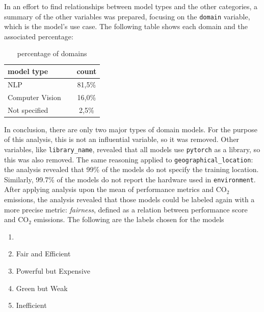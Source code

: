 \documentclass[journal]{IEEEtran}
\begin{document}
	 In an effort to find relationships between model types and the other categories, a summary of the other variables was prepared, focusing on the \texttt{domain} variable, which is the model's use case. The following table shows each domain and the associated percentage:
	 \begin{table}[H]
	 	\centering
	 	\caption{percentage of domains}
	 	\begin{tabular}{l c }
	 		\toprule
	 		model type & count \\
	 		\midrule
	 		NLP  & 81,5\% \\
	 		Computer Vision & 16,0\% \\
	 		Not specified        & 2,5\% \\
	 		\bottomrule
	 	\end{tabular}
	 	\label{tab:domain_percentage}
	 \end{table}
	 In conclusion, there are only two major types of domain models. For the purpose of this analysis, this is not an influential variable, so it was removed.
	 Other variables, like \texttt{library\_name}, revealed that all models use \texttt{pytorch} as a library, so this was also removed. The same reasoning applied to \texttt{geographical\_location}: the analysis revealed that 99\% of the models do not specify the training location. Similarly, 99.7\% of the models do not report the hardware used in \texttt{environment}.
	 After applying analysis upon the mean of performance metrics and $\text{CO}_2$ emissions, the analysis revealed that those models could be labeled again with a more precise metric: \textit{fairness}, defined as a relation between performance score and $\text{CO}_2$ emissions. The following are the labels chosen for the models
	 \begin{enumerate}
	 	\item[]\hspace{-\labelwidth}\hspace{-\labelsep}
	 	\item Fair and Efficient
	 	\item Powerful but Expensive
	 	\item Green but Weak
	 	\item Inefficient
	 \end{enumerate}
\end{document}
